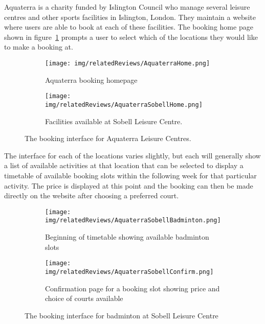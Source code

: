 Aquaterra is a charity funded by Islington Council who manage several leisure
centres and other sports facilities in Islington, London. They maintain a
website\cite{AquaterraLeisure} where users are able to book at each of these
facilities. The booking home page shown in figure~\ref{fig:AquaterraHome}
prompts a user to select which of the locations they would like to make a
booking at.
\begin{figure}[ht]
	\centering
	\begin{subfigure}[b]{0.3\textwidth}
		\texttt{[image: img/relatedReviews/AquaterraHome.png]}
		\caption{Aquaterra booking homepage}\label{fig:AquaterraHome}
	\end{subfigure}
	\qquad
	\begin{subfigure}[b]{0.3\textwidth}
		\texttt{[image: img/relatedReviews/AquaterraSobellHome.png]}
		\caption{Facilities available at Sobell Leisure Centre.
		}\label{fig:AquaterraSobellHome}
	\end{subfigure}
	\qquad
	\caption{The booking interface for Aquaterra Leisure Centres.
	}\label{fig:AquaterraHomeMain}
\end{figure}

The interface for each of the locations varies slightly, but each will
generally show a list of available activities at that location that can be
selected to display a timetable of available booking slots within the following
week for that particular activity. The price is displayed at this point and the
booking can then be made directly on the website after choosing a preferred
court.
\begin{figure}[ht]
	\centering
	\begin{subfigure}[b]{0.4\textwidth}
		\texttt{[image: img/relatedReviews/AquaterraSobellBadminton.png]}
		\caption{Beginning of timetable showing available badminton
		slots}\label{fig:AquaterraSobellBadminton}
	\end{subfigure}
	\qquad
	\begin{subfigure}[b]{0.4\textwidth}
		\texttt{[image: img/relatedReviews/AquaterraSobellConfirm.png]}
		\caption{Confirmation page for a booking slot showing price and choice
		of courts available}\label{fig:AquaterraSobellConfirm}
	\end{subfigure}
	\qquad
	\caption{The booking interface for badminton at Sobell Leisure
	Centre}\label{fig:AquaterraSobellBadmintonMain}
\end{figure}

